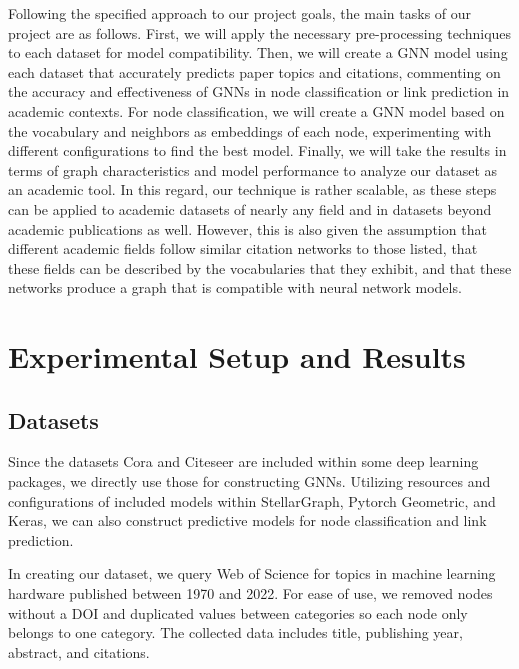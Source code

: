 \documentclass[conference]{IEEEtran}
\begin{document}
Following the specified approach to our project goals, the main tasks of our project are as follows. 
First, we will apply the necessary pre-processing techniques to each dataset for model compatibility. 
Then, we will create a GNN model using each dataset that accurately predicts paper topics and citations, 
commenting on the accuracy and effectiveness of GNNs in node classification or link prediction in academic 
contexts. For node classification, we will create a GNN model based on the vocabulary and neighbors as 
embeddings of each node, experimenting with different configurations to find the best model. Finally, 
we will take the results in terms of graph characteristics and model performance to analyze our dataset 
as an academic tool. In this regard, our technique is rather scalable, as these steps can be applied to 
academic datasets of nearly any field and in datasets beyond academic publications as well. However, 
this is also given the assumption that different academic fields follow similar citation networks to 
those listed, that these fields can be described by the vocabularies that they exhibit, and that 
these networks produce a graph that is compatible with neural network models. \par

\section{Experimental Setup and Results}

\subsection{Datasets}

Since the datasets Cora and Citeseer are included within some deep learning packages, 
we directly use those for constructing GNNs. Utilizing resources and configurations of 
included models within StellarGraph, Pytorch Geometric, and Keras, we can also construct 
predictive models for node classification and link prediction. \par

In creating our dataset, we query Web of Science for topics in machine learning 
hardware published between 1970 and 2022. For ease of use, we removed nodes without a 
DOI and duplicated values between categories so each node only belongs to one category. 
The collected data includes title, publishing year, abstract, and citations. \par
\end{document}
